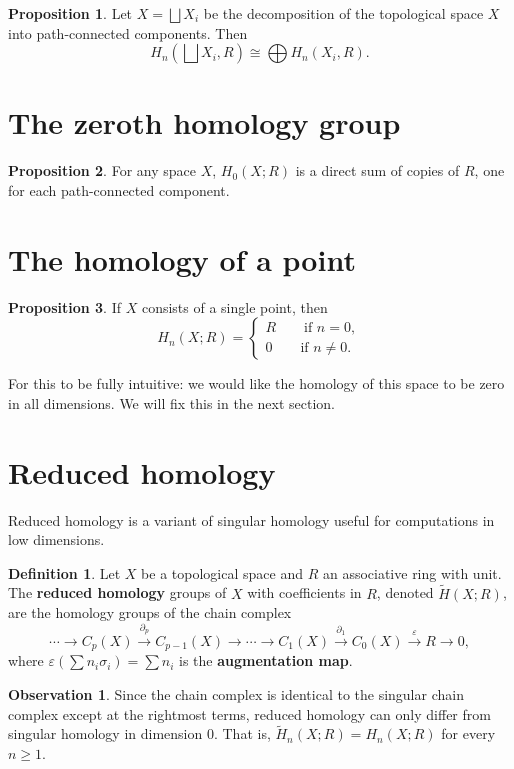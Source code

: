 \documentclass{book}
\theoremstyle{definition}
\newtheorem*{defn}{Definition}
\newtheorem*{obs}{Observation}
\newtheorem*{prop}{Proposition}
\begin{document}
\begin{prop}
Let $X=\bigsqcup X_i$ be the decomposition of the topological
space $X$ into path-connected components. Then
$$
H_n\left(\bigsqcup X_i,R\right)
\cong
\bigoplus H_n(X_i,R).
$$
\end{prop}

\section{The zeroth homology group}

\begin{prop}
For any space $X$, $H_0(X;R)$ is a direct sum of copies of
$R$, one for each path-connected component.
\end{prop}

\section{The homology of a point}

\begin{prop}
If $X$ consists of a single point, then
$$
H_n(X;R)=
\begin{cases}
R\qquad\text{if } n=0,\\
0\qquad\text{if } n\neq0.
\end{cases}
$$
\end{prop}

For this to be fully intuitive: we would like the homology of
this space to be zero in all dimensions. We will fix this in
the next section.

\section{Reduced homology}\label{sec:6.4}

Reduced homology is a variant of singular homology useful for
computations in low dimensions.

\begin{defn}
Let $X$ be a topological space and $R$ an associative ring
with unit. The \textbf{reduced homology} groups of $X$ with
coefficients in $R$, denoted $\tilde H(X;R)$, are the
homology groups of the chain complex
$$
\cdots\to C_p(X)\xrightarrow{\partial_p}C_{p-1}(X)
\to\cdots\to C_1(X)\xrightarrow{\partial_1}C_0(X)
\xrightarrow{\varepsilon}R\to0,
$$
where
$\varepsilon(\sum n_i\sigma_i)=\sum n_i$ is the
\textbf{augmentation map}.
\end{defn}

\begin{obs}
Since the chain complex is identical to the singular chain
complex except at the rightmost terms, reduced homology can
only differ from singular homology in dimension 0. That is,
$\tilde H_n(X;R)=H_n(X;R)$ for every $n\geq1$.
\end{obs}
\end{document}
